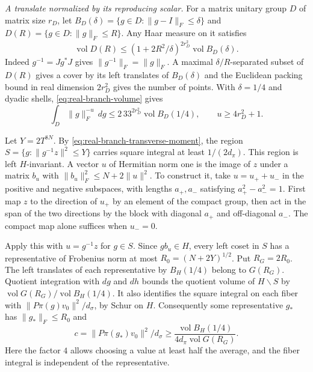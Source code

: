 \emph{A translate normalized by its reproducing scalar.}
For a matrix unitary group \(D\) of matrix size \(r_D\), let
\(B_D(\delta)=\{g\in D:\|g-I\|_F\le\delta\}\) and
\(D(R)=\{g\in D:\|g\|_F\le R\}\). Any Haar measure on it satisfies
\begin{equation}
 \operatorname{vol}D(R)
 \le(1+2R^2/\delta)^{2r_D^2}\operatorname{vol} B_D(\delta).
 \label{eq:real-branch-volume}
\end{equation}
Indeed \(g^{-1}=Jg^*J\) gives \(\|g^{-1}\|_F=\|g\|_F\). A maximal
\(\delta/R\)-separated subset of \(D(R)\) gives a cover by its left
translates of \(B_D(\delta)\) and the Euclidean packing bound in
real dimension \(2r_D^2\) gives the number of points. With
\(\delta=1/4\) and dyadic shells, \eqref{eq:real-branch-volume} gives
\begin{equation}
 \int_D\|g\|_F^{-u}\,dg
 \le 2\,33^{2r_D^2}\operatorname{vol}B_D(1/4),
 \qquad u\ge 4r_D^2+1.
 \label{eq:real-branch-power-integral}
\end{equation}

Let \(Y=2T^{8N}\). By \eqref{eq:real-branch-transverse-moment}, the
region \(S=\{g:\|g^{-1}z\|^2\le Y\}\) carries square integral at
least \(1/(2d_\pi)\). This region is left \(H\)-invariant. A vector
\(u\) of Hermitian norm one is the image of \(z\) under a matrix
\(b_u\) with \(\|b_u\|_F^2\le N+2\|u\|^2\). To construct it, take
\(u=u_++u_-\) in the positive and negative subspaces, with lengths
\(a_+,a_-\) satisfying \(a_+^2-a_-^2=1\). First map \(z\) to the
direction of \(u_+\) by an element of the compact group, then act
in the span of the two directions by the block with diagonal
\(a_+\) and off-diagonal \(a_-\). The compact map alone suffices
when \(u_-=0\).

Apply this with \(u=g^{-1}z\) for \(g\in S\). Since \(g b_u\in H\),
every left coset in \(S\) has a representative of Frobenius norm
at most \(R_0=(N+2Y)^{1/2}\). Put \(R_G=2R_0\). The left translates
of each representative by \(B_H(1/4)\) belong to \(G(R_G)\).
Quotient integration with \(dg\) and \(dh\) bounds the quotient
volume of \(H\backslash S\) by
\(\operatorname{vol}G(R_G)/\operatorname{vol}B_H(1/4)\). It also
identifies the square integral on each fiber with
\(\|P\pi(g)v_0\|^2/d_\sigma\), by Schur on \(H\). Consequently some
representative \(g_*\) has \(\|g_*\|_F\le R_0\) and
\begin{equation}
 c=\|P\pi(g_*)v_0\|^2/d_\sigma\ge
  \frac{\operatorname{vol}B_H(1/4)}
       {4d_\pi\operatorname{vol}G(R_G)} .
 \label{eq:real-branch-normalized-lower}
\end{equation}
Here the factor \(4\) allows choosing a value at least half the
average, and the fiber integral is independent of the representative.

